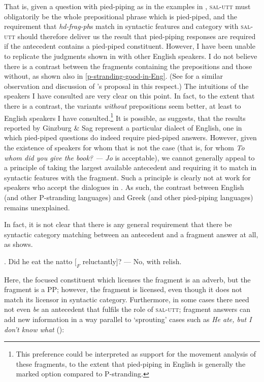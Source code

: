 \documentclass[doublespace]{umthesis}
\begin{document}
That is, given a question with pied-piping as in the examples in \Last, \textsc{sal-utt} must obligatorily be the whole prepositional phrase which is pied-piped, and the requirement that {\it hd-frag-ph}s match in syntactic features and category with \textsc{sal-utt} should therefore deliver us the result that pied-piping responses are required if the antecedent contains a pied-piped constituent. However, I have been unable to replicate the judgments shown in \Last with other English speakers. I do not believe there is a contrast between the fragments containing the prepositions and those without, as shown also in \ref{p-stranding-good-in-Eng}. (See \cite[fn.~8]{Me04} for a similar observation and discussion of \cite{GS00}'s proposal in this respect.) The intuitions of the speakers I have consulted are very clear on this point. In fact, to the extent that there is a contrast, the variants \emph{without} prepositions seem better, at least to English speakers I have consulted.\footnote{This preference could be interpreted as support for the movement analysis of these fragments, to the extent that pied-piping in English is generally the marked option compared to P-stranding.} It is possible, as \cite{Me04} suggests, that the results reported by Ginzburg \& Sag represent a particular dialect of English, one in which pied-piped questions do indeed require pied-piped answers. However, given the existence of speakers for whom that is not the case (that is, for whom {\it To whom did you give the book? --- Jo} is acceptable), we cannot generally appeal to a principle of taking the largest available antecedent and requiring it to match in syntactic features with the fragment. Such a principle is clearly not at work for speakers who accept the dialogues in \Last. As such,  the contrast between English (and other P-stranding languages) and Greek (and other pied-piping languages) remains unexplained.

In fact, it is not clear that there is any general requirement that there be syntactic category matching between an antecedent and a fragment answer at all, as \Next shows. 

\ex. 	 Did he eat the natto $[_F$ reluctantly$]$? --- No, with relish.

Here, the focused constituent which licenses the fragment is an adverb, but the fragment is a PP; however, the fragment is licensed, even though it does not match its licensor in syntactic category. Furthermore, in some cases there need not even \emph{be} an antecedent that fulfils the role of \textsc{sal-utt}; fragment answers can add new information in a way parallel to `sprouting' cases such as {\it He ate, but I don't know what} (\cite{CLMcC11}):
\end{document}
